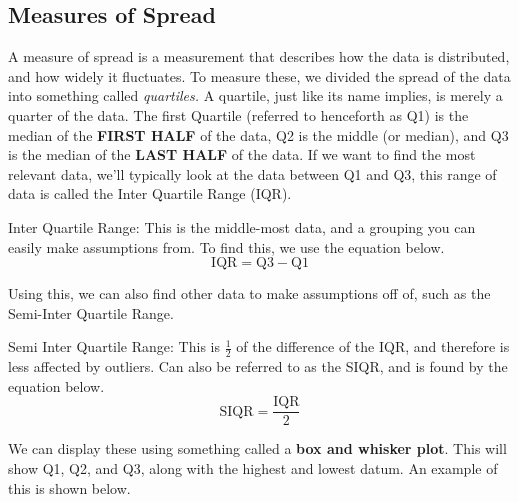     \subsection{Measures of Spread}
    A measure of spread is a measurement that describes how the data is distributed, and how widely it fluctuates.
    To measure these, we divided the spread of the data into something called \emph{quartiles.}
    A quartile, just like its name implies, is merely a quarter of the data.
    The first Quartile (referred to henceforth as Q1) is the median of the \textbf{FIRST HALF} of the data, Q2 is the middle (or median), and Q3 is the median of the \textbf{LAST HALF} of the data.
    If we want to find the most relevant data, we'll typically look at the data between Q1 and Q3, this range of data is called the Inter Quartile Range (IQR).
    \begin{definition}
        Inter Quartile Range: This is the middle-most data, and a grouping you can easily make assumptions from. To find this, we use the equation below.
        \begin{equation*}
            \mbox{IQR} = \mbox{Q3}-\mbox{Q1}
        \end{equation*}
    \end{definition}
    Using this, we can also find other data to make assumptions off of, such as the Semi-Inter Quartile Range.
    \begin{definition}
        Semi Inter Quartile Range: This is $\frac{1}{2}$ of the difference of the IQR, and therefore is less affected by outliers. Can also be referred to as the SIQR, and is found by the equation below.
        \begin{equation*}
            \mbox{SIQR} = \frac{\mbox{IQR}}{2}
        \end{equation*}
    \end{definition}
    We can display these using something called a \textbf{box and whisker plot}.
    This will show Q1, Q2, and Q3, along with the highest and lowest datum.
    An example of this is shown below.
    \begin{center}
    \end{center}

